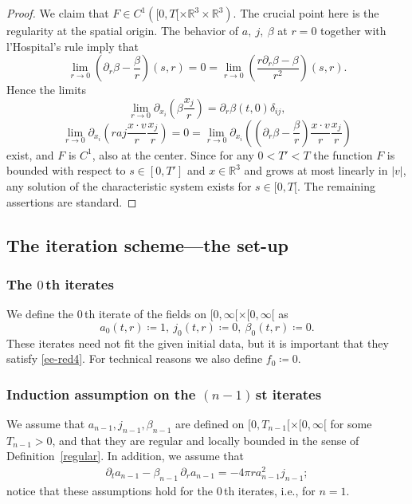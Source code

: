 \documentclass[11pt]{article}
\def\R{\mathbb R}
\begin{document}
%
\begin{proof}
  We claim that $F\in C^1([0,T[\times\R^3\times\R^3)$. The crucial point here is
  the regularity at the spatial origin. The behavior of $a,\ j,\ \beta$
  at $r=0$ together with l'Hospital's rule imply that
  \[
  \lim_{r\to 0}\left(\partial_r\beta-\frac{\beta}{r}\right)(s,r)
  = 0 = \lim_{r\to 0}\left(\frac{r \partial_r\beta-\beta}{r^2}\right)(s,r).
  \]
  Hence the limits
  \[
  \lim_{r\to 0} \partial_{x_i}\left(\beta\frac{x_j}{r}\right)
  = \partial_r\beta(t,0)\delta_{ij},
  \]
  \[
  \lim_{r\to 0} \partial_{x_i}\left(r a j\frac{x\cdot v}{r}\frac{x_j}{r}\right)
  = 0 =
  \lim_{r\to 0} \partial_{x_i}
  \left(\left(\partial_r\beta-\frac{\beta}{r}\right)
  \frac{x\cdot v}{r}\frac{x_j}{r}\right)
  \]
  exist, and $F$ is $C^1$, also at the center.
  Since for any $0<T'<T$ the function $F$ is bounded with respect to
  $s\in [0,T']$ and $x\in \R^3$ and
  grows at most linearly in $|v|$, any solution of the
  characteristic system exists
  for $s\in [0,T[$. The remaining assertions are standard.
\end{proof}
%    
%
\subsection{The iteration scheme---the set-up}
%
%
\subsubsection{The $0\,$th iterates}
%
%
We define the $0\,$th iterate of the fields on $[0,\infty[\times [0,\infty[$
as
\[
a_0(t,r) \coloneqq 1,\ j_0(t,r) \coloneqq 0,\ \beta_0(t,r) \coloneqq 0.
\]
These iterates need not fit the given initial data, but it is
important that they satisfy \eqref{ee-red4}.
For technical reasons we also define
$f_0 \coloneqq 0$.
%
%
\subsubsection{Induction assumption on the $(n-1)\,$st iterates}
%
%
We assume that $a_{n-1}, j_{n-1}, \beta_{n-1}$ are defined on
$[0,T_{n-1}[\times [0,\infty[$ for some $T_{n-1}>0$,
and that they are regular and locally bounded
in the sense of Definition~\ref{regular}. In addition, we
assume that
\begin{align}\label{ee4-red-n-1}
  \partial_t a_{n-1} -\beta_{n-1}\, \partial_r a_{n-1} = - 4\pi r a_{n-1}^2 j_{n-1};
\end{align}
notice that these assumptions hold for the $0\,$th iterates, i.e., for $n=1$.
%
%
\end{document}
